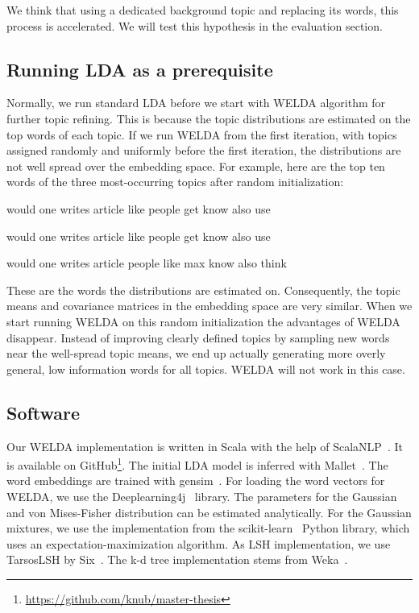 \documentclass[
        a4paper,
        titlepage,
        twoside,
        parskip
        ]{scrbook}
\newcommand{\topicbox}[1]{
  \setlength{\OuterFrameSep}{0pt}
  \begin{framed}
    #1
  \end{framed}
}
\theoremstyle{break}
\begin{document}
We think that using a dedicated background topic and replacing its words, this process is accelerated.
We will test this hypothesis in the evaluation section.

\subsection{Running LDA as a prerequisite}
Normally, we run standard LDA before we start with WELDA algorithm for further topic refining.
This is because the topic distributions are estimated on the top words of each topic.
If we run WELDA from the first iteration, with topics assigned randomly and uniformly before the first iteration, the distributions are not well spread over the embedding space.
For example, here are the top ten words of the three most-occurring topics after random initialization:
\topicbox{
  would one writes article like people get know also use \par
  would one writes article like people get know also use \par
  would one writes article people like max know also think
}

These are the words the distributions are estimated on.
Consequently, the topic means and covariance matrices in the embedding space are very similar.
When we start running WELDA on this random initialization the advantages of WELDA disappear.
Instead of improving clearly defined topics by sampling new words near the well-spread topic means, we end up actually generating more overly general, low information words for all topics.
WELDA will not work in this case.

\subsection{Software}

Our WELDA implementation is written in Scala with the help of ScalaNLP~\cite{ScalaNlp2009}.
It is available on GitHub\footnote{\url{https://github.com/knub/master-thesis}}.
The initial LDA model is inferred  with Mallet~\cite{McCallum2002}.
The word embeddings are trained with gensim~\cite{Rehurek2010}.
For loading the word vectors for WELDA, we use the Deeplearning4j~\cite{DL4J2016} library.
The parameters for the Gaussian and von Mises-Fisher distribution can be estimated analytically.
For the Gaussian mixtures, we use the implementation from the scikit-learn~\cite{Pedregosa2012} Python library, which uses an expectation-maximization algorithm.
As LSH implementation, we use TarsosLSH by Six~\cite{Six2016}.
The k-d tree implementation stems from Weka~\cite{Hall2009}.
\end{document}
